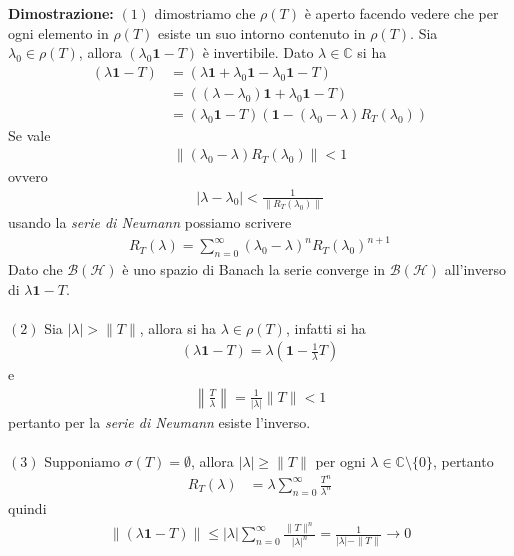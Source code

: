 \documentclass{article}
\numberwithin{equation}{subsection}
\begin{document}
\textbf{Dimostrazione:} $(1)$ dimostriamo che $\rho(T)$ è aperto facendo vedere che per ogni elemento in $\rho(T)$ esiste un suo intorno contenuto in $\rho(T)$. Sia $\lambda_0 \in \rho(T)$, allora $(\lambda_0\mathbf{1} - T)$ è invertibile. Dato $\lambda \in \mathbb{C}$ si ha 
\begin{align*}
    (\lambda\mathbf{1} - T) &= (\lambda\mathbf{1} + \lambda_0\mathbf{1} - \lambda_0\mathbf{1} - T)  \\
    &= ((\lambda - \lambda_0)\mathbf{1} + \lambda_0\mathbf{1} - T)  \\
    &= (\lambda_0\mathbf{1} - T)(\mathbf{1} - (\lambda_0 - \lambda)R_T(\lambda_0))
\end{align*}
Se vale
\begin{align*}
    \|(\lambda_0 - \lambda)R_T(\lambda_0)\| < 1 
\end{align*}
ovvero 
\begin{align*}
    |\lambda - \lambda_0| < \frac{1}{\|R_T(\lambda_0)\|} 
\end{align*}
usando la \textit{serie di Neumann} possiamo scrivere 
\begin{align*}
    R_T(\lambda) = \sum_{n = 0}^\infty (\lambda_0 - \lambda)^nR_T(\lambda_0)^{n + 1} 
\end{align*}
Dato che $\mathcal{B}(\mathcal{H})$ è uno spazio di Banach la serie converge in $\mathcal{B}(\mathcal{H})$ all'inverso di $\lambda\mathbf{1} - T$. \\ \\
$(2)$ Sia $|\lambda| > \|T\|$, allora si ha $\lambda \in \rho(T)$, infatti si ha 
\begin{align*}
    (\lambda\mathbf{1} - T) = \lambda\left(\mathbf{1} - \frac{1}{\lambda}T\right) 
\end{align*}
e 
\begin{align*}
    \left\|\frac{T}{\lambda}\right\| = \frac{1}{|\lambda|}\|T\| < 1 
\end{align*}
pertanto per la \textit{serie di Neumann} esiste l'inverso. \\ \\
$(3)$ Supponiamo $\sigma(T) = \emptyset$, allora $|\lambda| \geq \|T\|$ per ogni $\lambda \in \mathbb{C} \setminus \{0\}$, pertanto 
\begin{align*}
    R_T(\lambda) &= \lambda\sum_{n = 0}^\infty \frac{T^n}{\lambda^n} 
\end{align*}
quindi 
\begin{align*}
    \|(\lambda\mathbf{1} - T)\| \leq |\lambda|\sum_{n = 0}^\infty \frac{\|T\|^n}{|\lambda|^n} = \frac{1}{|\lambda| - \|T\|} \rightarrow 0 
\end{align*}
\end{document}
